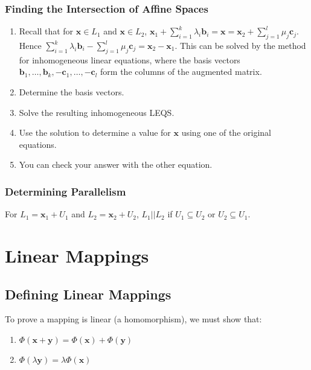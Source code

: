 \documentclass[10pt,twoside,twocolumn]{article}
\begin{document}
\subsubsection{Finding the Intersection of Affine Spaces}
\begin{enumerate}
\item Recall that for $\mathbf{x}\in L_{1}$ and $\mathbf{x}\in L_{2}$,
$\mathbf{x}_{1}+\sum_{i=1}^{k}\lambda_{i}\mathbf{b}_{i}=\mathbf{x}=\mathbf{x}_{2}+\sum_{j=1}^{l}\mu_{j}\mathbf{c}_{j}$.
Hence $\sum_{i=1}^{k}\lambda_{i}\mathbf{b}_{i}-\sum_{j=1}^{l}\mu_{j}\mathbf{c}_{j}=\mathbf{x}_{2}-\mathbf{x}_{1}$.
This can be solved by the method for inhomogeneous linear equations,
where the basis vectors $\mathbf{b}_{1},\dots,\mathbf{b}_{k},-\mathbf{c}_{1},\dots,-\mathbf{c}_{l}$
form the columns of the augmented matrix.
\item Determine the basis vectors.
\item Solve the resulting inhomogeneous LEQS.
\item Use the solution to determine a value for $\mathbf{x}$ using one
of the original equations.
\item You can check your answer with the other equation.
\end{enumerate}

\subsubsection{Determining Parallelism}

For $L_{1}=\mathbf{x}_{1}+U_{1}$ and $L_{2}=\mathbf{x}_{2}+U_{2}$,
$L_{1}||L_{2}$ if $U_{1}\subseteq U_{2}$ or $U_{2}\subseteq U_{1}$.


\section{Linear Mappings}


\subsection{Defining Linear Mappings}

To prove a mapping is linear (a homomorphism), we must show that: 
\begin{enumerate}
\item $\Phi\left(\mathbf{x}+\mathbf{y}\right)=\Phi\left(\mathbf{x}\right)+\Phi\left(\mathbf{y}\right)$ 
\item $\Phi\left(\lambda\mathbf{y}\right)=\lambda\Phi\left(\mathbf{x}\right)$ 
\end{enumerate}
\end{document}
